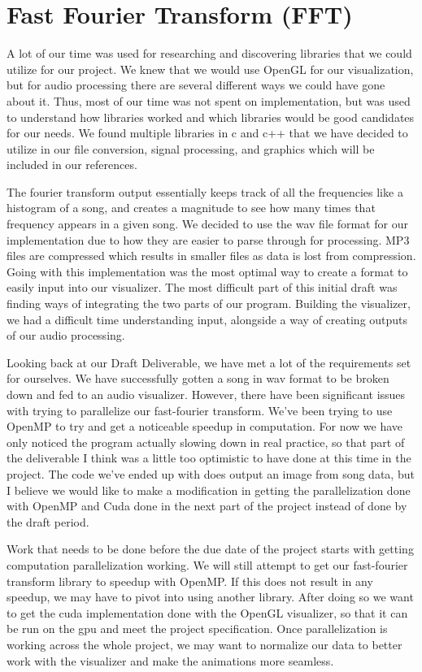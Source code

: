 \documentclass{article}
\begin{document}
\section{Fast Fourier Transform (FFT)}
\par A lot of our time was used for researching and discovering libraries that we could utilize for our project. We knew that we would use OpenGL for our visualization, but for audio processing there are several different ways we could have gone about it. Thus, most of our time was not spent on implementation, but was used to understand how libraries worked and which libraries would be good candidates for our needs. We found multiple libraries in c and c++ that we have decided to utilize in our file conversion, signal processing, and graphics which will be included in our references. 
\par The fourier transform output essentially keeps track of all the frequencies like a histogram of a song, and creates a magnitude to see how many times that frequency appears in a given song. We decided to use the wav file format for our implementation due to how they are easier to parse through for processing. MP3 files are compressed which results in smaller files as data is lost from compression. Going with this implementation was the most optimal way to create a format to easily input into our visualizer. The most difficult part of this initial draft was finding ways of integrating the two parts of our program. Building the visualizer, we had a difficult time understanding input, alongside a way of creating outputs of our audio processing. 
\par Looking back at our Draft Deliverable, we have met a lot of the requirements set for ourselves. We have successfully gotten a song in wav format to be broken down and fed to an audio visualizer. However, there have been significant issues with trying to parallelize our fast-fourier transform. We’ve been trying to use OpenMP to try and get a noticeable speedup in computation. For now we have only noticed the program actually slowing down in real practice, so that part of the deliverable I think was a little too optimistic to have done at this time in the project. The code we’ve ended up with does output an image from song data, but I believe we would like to make a modification in getting the parallelization done with OpenMP and Cuda done in the next part of the project instead of done by the draft period. 
\par Work that needs to be done before the due date of the project starts with getting computation parallelization working. We will still attempt to get our fast-fourier transform library to speedup with OpenMP. If this does not result in any speedup, we may have to pivot into using another library. After doing so we want to get the cuda implementation done with the OpenGL visualizer, so that it can be run on the gpu and meet the project specification. Once parallelization is working across the whole project, we may want to normalize our data to better work with the visualizer and make the animations more seamless. 
\end{document}
